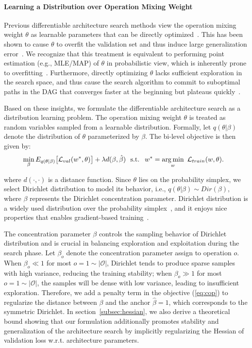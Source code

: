 \documentclass{article} \usepackage{iclr2021_conference,times}
\DeclareMathOperator*{\argmin}{arg\,min}
\begin{document}
\paragraph{Learning a Distribution over Operation Mixing Weight}
Previous differentiable architecture search methods view the operation mixing weight $\theta$ as learnable parameters that can be directly optimized~\citep{darts, pcdarts, gaea}.
This has been shown to cause $\theta$ to overfit the validation set and thus induce large generalization error~\citep{understanding,nasbench1shot1,smoothdarts}. 
We recognize that this treatment is equivalent to performing point estimation (e.g., MLE/MAP) of $\theta$ in probabilistic view, which is inherently prone to overfitting~\citep{prml, bayesian}.
Furthermore, directly optimizing $\theta$ lacks sufficient exploration in the search space, and thus cause the search algorithm to commit to suboptimal paths in the DAG that converges faster at the beginning but plateaus quickly~\citep{WideShallow}.

Based on these insights, we formulate the differentiable architecture search as a distribution learning problem.
The operation mixing weight $\theta$ is treated as random variables sampled from a learnable distribution.
Formally, let $q(\theta|\beta)$ denote the distribution of $\theta$ parameterized by $\beta$.
The bi-level objective is then given by:
\begin{align}
\label{eq:cop}
    &\min_{\beta} E_{q(\theta|\beta)} \big{[}\mathcal{L}_{val} (w^*, \theta)\big{]} + 
    \lambda d(\beta, \hat\beta) \
    \text{ s.t. }\ w^* = \argmin_w\ \mathcal{L}_{train}(w,\theta).
\end{align}

where $d(\cdot, \cdot)$ is a distance function.
Since $\theta$ lies on the probability simplex, we select Dirichlet distribution to model its behavior, i.e., $q(\theta|\beta) \sim Dir(\beta)$, where $\beta$ represents the Dirichlet concentration parameter.
Dirichlet distribution is a widely used distribution over the probability simplex~\citep{drvae, lda, ndp, bcl}, and it enjoys nice properties that enables gradient-based training~\citep{pathwise}.

The concentration parameter $\beta$ controls the sampling behavior of Dirichlet distribution and is crucial in balancing exploration and exploitation during the search phase.
Let $\beta_o$ denote the concentration parameter assign to operation $o$.
When $\beta_o \ll 1$ for most $o=1\sim |\mathcal{O}|$, Dirichlet tends to produce sparse samples with high variance, reducing the training stability; when $\beta_o \gg 1$ for most $o=1\sim |\mathcal{O}|$, the samples will be dense with low variance, leading to insufficient exploration.
Therefore, we add a penalty term in the objective (\ref{eq:cop}) to regularize the distance between $\beta$ and the anchor $\hat\beta = 1$, which corresponds to the symmetric Dirichlet.
In section~\ref{subsec:hessian}, we also derive a theoretical bound showing that our formulation additionally promotes stability and generalization of the architecture search by implicitly regularizing the Hessian of validation loss w.r.t. architecture parameters.
\end{document}
